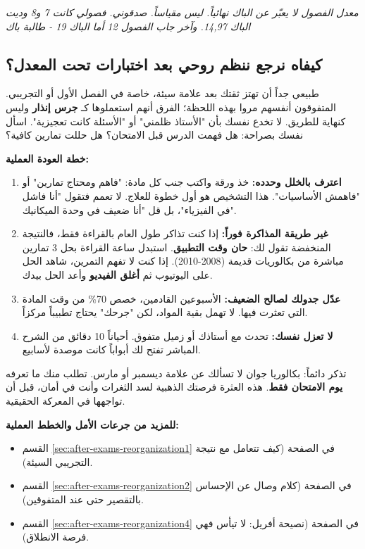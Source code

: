 \documentclass[12pt,a4paper]{book}
\newcommand{\quoteAr}[1]{%
	\begin{myquote}
		\itshape #1
	\end{myquote}
}
\begin{document}
	\quoteAr{معدل الفصول لا يعبّر عن الباك نهائياً. ليس مقياساً. صدقوني. فصولي كانت 7 و8 وديت الباك 14,97. وآخر جاب الفصول 12 أما الباك 19 - طالبة باك}
	
	\subsection{كيفاه نرجع ننظم روحي بعد اختبارات تحت المعدل؟}
	\label{sec:recover-from-bad-grade}
	
	طبيعي جداً أن تهتز ثقتك بعد علامة سيئة، خاصة في الفصل الأول أو التجريبي. المتفوقون أنفسهم مروا بهذه اللحظة؛ الفرق أنهم استعملوها كـ \textbf{جرس إنذار} وليس كنهاية للطريق. لا تخدع نفسك بأن "الأستاذ ظلمني" أو "الأسئلة كانت تعجيزية". اسأل نفسك بصراحة: هل فهمت الدرس قبل الامتحان؟ هل حللت تمارين كافية؟
	
	\textbf{خطة العودة العملية:}
	\begin{enumerate}
		\item \textbf{اعترف بالخلل وحدده:} خذ ورقة واكتب جنب كل مادة: "فاهم ومحتاج تمارين" أو "فاهمش الأساسيات". هذا التشخيص هو أول خطوة للعلاج. لا تعمم فتقول "أنا فاشل في الفيزياء"، بل قل "أنا ضعيف في وحدة الميكانيك".
		\item \textbf{غير طريقة المذاكرة فوراً:} إذا كنت تذاكر طول العام بالقراءة فقط، فالنتيجة المنخفضة تقول لك: \textbf{حان وقت التطبيق}. استبدل ساعة القراءة بحل 3 تمارين مباشرة من بكالوريات قديمة (2008-2010). إذا كنت لا تفهم التمرين، شاهد الحل على اليوتيوب ثم \textbf{أغلق الفيديو} وأعد الحل بيدك.
		\item \textbf{عدّل جدولك لصالح الضعيف:} الأسبوعين القادمين، خصص 70\% من وقت المادة التي تعثرت فيها. لا تهمل بقية المواد، لكن "جرحك" يحتاج تطبيباً مركزاً.
		\item \textbf{لا تعزل نفسك:} تحدث مع أستاذك أو زميل متفوق. أحياناً 10 دقائق من الشرح المباشر تفتح لك أبواباً كانت موصدة لأسابيع.
	\end{enumerate}
	
	تذكر دائماً: بكالوريا جوان لا تسألك عن علامة ديسمبر أو مارس. تطلب منك ما تعرفه \textbf{يوم الامتحان فقط}. هذه العثرة فرصتك الذهبية لسد الثغرات وأنت في أمان، قبل أن تواجهها في المعركة الحقيقية.
	
	\textbf{للمزيد من جرعات الأمل والخطط العملية:}
	\begin{itemize}
		\item القسم \ref{sec:after-exams-reorganization1} في الصفحة \pageref{sec:after-exams-reorganization1} (كيف تتعامل مع نتيجة التجريبي السيئة).
		\item القسم \ref{sec:after-exams-reorganization2} في الصفحة \pageref{sec:after-exams-reorganization2} (كلام وصال عن الإحساس بالتقصير حتى عند المتفوقين).
		\item القسم \ref{sec:after-exams-reorganization4} في الصفحة \pageref{sec:after-exams-reorganization4} (نصيحة أفريل: لا تيأس فهي فرصة الانطلاق).
	\end{itemize}
	
\end{document}
